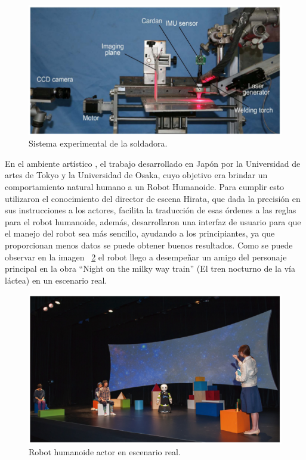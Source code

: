 \begin{figure}[H]
\centering
\includegraphics[width=0.8\columnwidth]{CapituloI/Imagenes/Welding.png}
\caption{Sistema experimental de la soldadora.}
\label{fig:syswelding}
\end{figure} 
 

En el ambiente artístico \cite{Nishiguchi2017}, el trabajo desarrollado en
 Japón por la Universidad de artes de Tokyo y la Universidad de Osaka, cuyo
 objetivo era brindar un comportamiento natural humano a un Robot Humanoide.
 Para cumplir esto utilizaron el conocimiento del director de escena Hirata,
 que dada la precisión en sus instrucciones a los actores, facilita la
 traducción de esas órdenes a las reglas para el robot humanoide, además,
 desarrollaron una interfaz de usuario para que el manejo del robot sea más
 sencillo, ayudando a los principiantes, ya que proporcionan menos datos se
 puede obtener buenos resultados. Como se puede observar en la imagen
 ~\ref{fig:theatricalrob} el robot llego a desempeñar un amigo del
 personaje principal en la obra ``Night on the milky way train''
 (El tren nocturno de la vía láctea) en un escenario real.


\begin{figure}[H]
\centering
\includegraphics[width=0.8\columnwidth]{CapituloI/Imagenes/Theatrical.png}
\caption{Robot humanoide actor en escenario real.}
\label{fig:theatricalrob}
\end{figure} 


